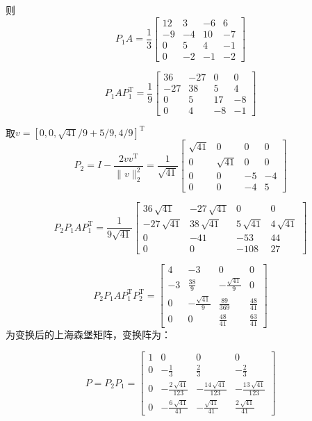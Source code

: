 \documentclass[UTF8,zihao=5]{ctexart}
\newcommand{\trans}[0]{^\mathrm{T}}
\begin{document}
则
$$
    P_1A=\frac{1}{3}\left[\begin{array}{cccc} 12 & 3 & -6 & 6\\ -9 & -4 & 10 & -7\\ 0 & 5 & 4 & -1\\ 0 & -2 & -1 & -2 \end{array}\right]
$$

$$
    P_1AP_1\trans=\frac{1}{9}\left[\begin{array}{cccc} 36 & -27 & 0 & 0\\ -27 & 38 & 5 & 4\\ 0 & 5 & 17 & -8\\ 0 & 4 & -8 & -1 \end{array}\right]
$$


取$v=[0,0,\sqrt{41}/9+5/9,4/9]\trans$
$$
    P_2=I-\frac{2vv\trans}{\|v\|^2_2}=\frac{1}{\sqrt{41}}\left[\begin{array}{cccc} \sqrt{41} & 0 & 0 & 0\\ 0 & \sqrt{41} & 0 & 0\\ 0 & 0 & -5 & -4\\ 0 & 0 & -4 & 5 \end{array}\right]
$$

$$
    P_2P_1AP_1\trans=
    \frac{1}{9\sqrt{41}}\left[\begin{array}{cccc} 36\,\sqrt{41} & -27\,\sqrt{41} & 0 & 0\\ -27\,\sqrt{41} & 38\,\sqrt{41} & 5\,\sqrt{41} & 4\,\sqrt{41}\\ 0 & -41 & -53 & 44\\ 0 & 0 & -108 & 27 \end{array}\right]
$$


$$
    P_2P_1AP_1 \trans P_2 \trans=
    \left[\begin{array}{cccc} 4 & -3 & 0 & 0\\ -3 & \frac{38}{9} & -\frac{\sqrt{41}}{9} & 0\\ 0 & -\frac{\sqrt{41}}{9} & \frac{89}{369} & \frac{48}{41}\\ 0 & 0 & \frac{48}{41} & \frac{63}{41} \end{array}\right]
$$
为变换后的上海森堡矩阵，变换阵为：

$$
    P=P_2P_1=
    \left[\begin{array}{cccc} 1 & 0 & 0 & 0\\ 0 & -\frac{1}{3} & \frac{2}{3} & -\frac{2}{3}\\ 0 & -\frac{2\,\sqrt{41}}{123} & -\frac{14\,\sqrt{41}}{123} & -\frac{13\,\sqrt{41}}{123}\\ 0 & -\frac{6\,\sqrt{41}}{41} & -\frac{\sqrt{41}}{41} & \frac{2\,\sqrt{41}}{41} \end{array}\right]
$$
\end{document}

